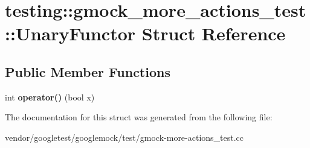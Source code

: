 \hypertarget{structtesting_1_1gmock__more__actions__test_1_1_unary_functor}{}\section{testing\+:\+:gmock\+\_\+more\+\_\+actions\+\_\+test\+:\+:Unary\+Functor Struct Reference}
\label{structtesting_1_1gmock__more__actions__test_1_1_unary_functor}
\subsection*{Public Member Functions}
\begin{DoxyCompactItemize}
\item 
\mbox{\label{structtesting_1_1gmock__more__actions__test_1_1_unary_functor_a3c33592b266e8ed2c7980df9868db53a}} 
int {\bfseries operator()} (bool x)
\end{DoxyCompactItemize}


The documentation for this struct was generated from the following file\+:\begin{DoxyCompactItemize}
\item 
vendor/googletest/googlemock/test/gmock-\/more-\/actions\+\_\+test.\+cc\end{DoxyCompactItemize}
